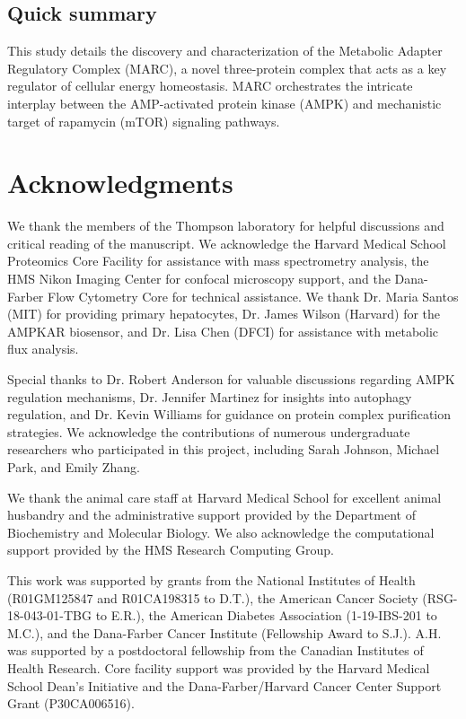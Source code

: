 \documentclass[11pt,a4paper]{article}
\begin{document}
\subsection{Quick summary}

This study details the discovery and characterization of the Metabolic Adapter Regulatory Complex (MARC), a novel three-protein complex that acts as a key regulator of cellular energy homeostasis. MARC orchestrates the intricate interplay between the AMP-activated protein kinase (AMPK) and mechanistic target of rapamycin (mTOR) signaling pathways.


\section*{Acknowledgments}

We thank the members of the Thompson laboratory for helpful discussions and critical reading of the manuscript. We acknowledge the Harvard Medical School Proteomics Core Facility for assistance with mass spectrometry analysis, the HMS Nikon Imaging Center for confocal microscopy support, and the Dana-Farber Flow Cytometry Core for technical assistance. We thank Dr. Maria Santos (MIT) for providing primary hepatocytes, Dr. James Wilson (Harvard) for the AMPKAR biosensor, and Dr. Lisa Chen (DFCI) for assistance with metabolic flux analysis.

Special thanks to Dr. Robert Anderson for valuable discussions regarding AMPK regulation mechanisms, Dr. Jennifer Martinez for insights into autophagy regulation, and Dr. Kevin Williams for guidance on protein complex purification strategies. We acknowledge the contributions of numerous undergraduate researchers who participated in this project, including Sarah Johnson, Michael Park, and Emily Zhang.

We thank the animal care staff at Harvard Medical School for excellent animal husbandry and the administrative support provided by the Department of Biochemistry and Molecular Biology. We also acknowledge the computational support provided by the HMS Research Computing Group.

This work was supported by grants from the National Institutes of Health (R01GM125847 and R01CA198315 to D.T.), the American Cancer Society (RSG-18-043-01-TBG to E.R.), the American Diabetes Association (1-19-IBS-201 to M.C.), and the Dana-Farber Cancer Institute (Fellowship Award to S.J.). A.H. was supported by a postdoctoral fellowship from the Canadian Institutes of Health Research. Core facility support was provided by the Harvard Medical School Dean's Initiative and the Dana-Farber/Harvard Cancer Center Support Grant (P30CA006516).
\end{document}
